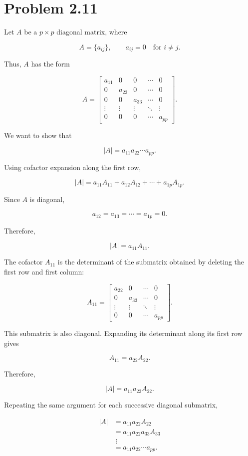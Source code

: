 \documentclass[12pt]{article}
\begin{document}
	\section*{Problem 2.11}
	
	Let $A$ be a $p\times p$ diagonal matrix, where
	
	\[
	A=\{a_{ij}\},
	\qquad
	a_{ij}=0\quad\text{for }i\neq j.
	\]
	
	Thus, $A$ has the form
	
	\[
	A=
	\begin{bmatrix}
		a_{11}&0&0&\cdots&0\\
		0&a_{22}&0&\cdots&0\\
		0&0&a_{33}&\cdots&0\\
		\vdots&\vdots&\vdots&\ddots&\vdots\\
		0&0&0&\cdots&a_{pp}
	\end{bmatrix}.
	\]
	
	We want to show that
	
	\[
	\boxed{
		|A|=a_{11}a_{22}\cdots a_{pp}
	}.
	\]
	
	Using cofactor expansion along the first row,
	
	\[
	|A|
	=
	a_{11}A_{11}
	+a_{12}A_{12}
	+\cdots
	+a_{1p}A_{1p}.
	\]
	
	Since $A$ is diagonal,
	
	\[
	a_{12}=a_{13}=\cdots=a_{1p}=0.
	\]
	
	Therefore,
	
	\[
	|A|
	=
	a_{11}A_{11}.
	\]
	
	The cofactor $A_{11}$ is the determinant of the submatrix
	obtained by deleting the first row and first column:
	
	\[
	A_{11}
	=
	\begin{bmatrix}
		a_{22}&0&\cdots&0\\
		0&a_{33}&\cdots&0\\
		\vdots&\vdots&\ddots&\vdots\\
		0&0&\cdots&a_{pp}
	\end{bmatrix}.
	\]
	
	This submatrix is also diagonal. Expanding its determinant along
	its first row gives
	
	\[
	A_{11}=a_{22}A_{22}.
	\]
	
	Therefore,
	
	\[
	|A|
	=
	a_{11}a_{22}A_{22}.
	\]
	
	Repeating the same argument for each successive diagonal submatrix,
	
	\[
	\begin{aligned}
		|A|
		&=a_{11}a_{22}A_{22}\\
		&=a_{11}a_{22}a_{33}A_{33}\\
		&\;\vdots\\
		&=a_{11}a_{22}\cdots a_{pp}.
	\end{aligned}
	\]
	
\end{document}
